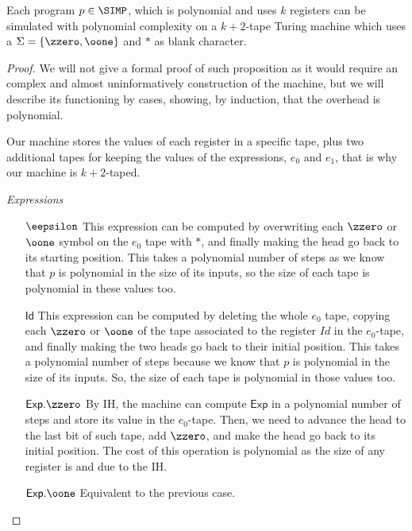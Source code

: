 \begin{prop}
Each program $p\in \SIMP$,
which is polynomial and uses $k$ registers
can be simulated with polynomial complexity
on a $k+2$-tape Turing machine which
uses a {$\Sigma=\{\zzero,\oone\}$}
and $*$ as blank character.
\end{prop}
\begin{proof}
We will not give a formal proof of such proposition
as it would require an complex and almost uninformatively
construction of the machine, but
we will describe its functioning by cases,
showing, by induction, that the overhead is polynomial.

Our machine stores the values of each register in
a specific tape, plus two additional tapes
for keeping the values of the expressions,
$e_0$ and $e_1$, that is why
our machine is $k+2$-taped.

\emph{Expressions}
\begin{itemize}
\item[{$\eepsilon$}]
This expression can be computed by
overwriting each {$\zzero$ or $\oone$}
symbol on the $e_0$ tape with $*$,
and finally making the head go back
to its starting position.
This takes a polynomial number of steps
as we know that $p$
is polynomial in the size of its
inputs,
so the size of each tape is polynomial in these
values too.

\item[$\mathsf{Id}$] This expression can be
computed by deleting the whole
$e_0$ tape,
copying each {$\zzero$
or $\oone$}
of the tape associated to the register
$Id$ in the $e_0$-tape, and finally
making the two heads go back to their initial
position.
%
This takes a polynomial number of steps
because we know that $p$
is polynomial in the size of its inputs.
So, the size of each tape is polynomial in those values
too.

\item[${\mathsf{Exp.\zzero}}$]
By IH, the machine can compute
$\mathsf{Exp}$ in a polynomial number
of steps and store its value in the $e_0$-tape.
Then, we need to advance the head to
the last bit of such tape,
add {$\zzero$}, and make
the head go back to its initial position.
The cost of this operation is
polynomial as the size of any register is
and due to the IH.

\item[${\mathsf{Exp.\oone}}$]
Equivalent to the previous case.


\end{itemize}
\end{proof}

